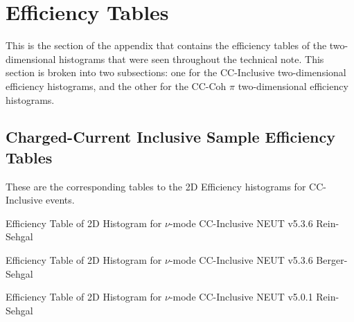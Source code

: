 \documentclass[11pt]{article}
\begin{document}
\section{Efficiency Tables}
\label{sec:EffTab}

This is the section of the appendix that contains the efficiency tables of the two-dimensional histograms that were seen throughout the technical note. This section is broken into two subsections: one for the CC-Inclusive two-dimensional efficiency histograms, and the other for the CC-Coh $\pi$ two-dimensional efficiency histograms.

\subsection{Charged-Current Inclusive Sample Efficiency Tables}
\label{sub:CCInclusiveEffTab}

These are the corresponding tables to the 2D Efficiency histograms for CC-Inclusive events.

\newpage
\begin{landscape}
\begin{table}
\centering
\caption{Efficiency Table of 2D Histogram for $\nu$-mode CC-Inclusive NEUT v5.3.6 Rein-Sehgal}
\label{tab:app:CCIncNMRS}
\begin{adjustbox}{width=\paperwidth}
\end{adjustbox}
\end{table}
\end{landscape}

\newpage
\begin{landscape}
\begin{table}
\centering
\caption{Efficiency Table of 2D Histogram for $\nu$-mode CC-Inclusive NEUT v5.3.6 Berger-Sehgal}
\label{tab:app:CCIncNMBS}
\begin{adjustbox}{width=\paperwidth}
\end{adjustbox}
\end{table}
\end{landscape}

\newpage
\begin{landscape}
\begin{table}
\centering
\caption{Efficiency Table of 2D Histogram for $\nu$-mode CC-Inclusive NEUT v5.0.1 Rein-Sehgal}
\label{tab:app:CCIncNMORS}
\begin{adjustbox}{width=\paperwidth}
\end{adjustbox}
\end{table}
\end{landscape}
\end{document}

